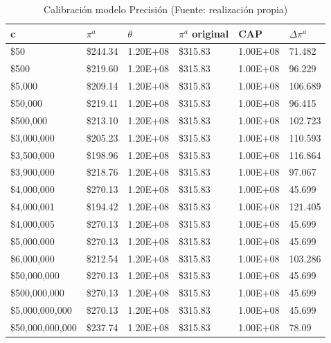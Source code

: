 \begin{table}[H]
    \centering
    \begin{tabular}{|l|l|l|l|l|l|}
    \hline
          c & $\pi^a$ & $\theta$ & $\pi^a$ original &  CAP & $\Delta \pi^a$   \\ \hline
         \$50  &  \$244.34  & 1.20E+08 &  \$315.83  & 1.00E+08 & 71.482  \\ \hline
         \$500  &  \$219.60  & 1.20E+08 &  \$315.83  & 1.00E+08 & 96.229  \\ \hline
         \$5,000  &  \$209.14  & 1.20E+08 &  \$315.83  & 1.00E+08 & 106.689  \\ \hline
         \$50,000  &  \$219.41  & 1.20E+08 &  \$315.83  & 1.00E+08 & 96.415  \\ \hline
         \$500,000  &  \$213.10  & 1.20E+08 &  \$315.83  & 1.00E+08 & 102.723  \\ \hline
         \$3,000,000  &  \$205.23  & 1.20E+08 &  \$315.83  & 1.00E+08 & 110.593  \\ \hline
         \$3,500,000  &  \$198.96  & 1.20E+08 &  \$315.83  & 1.00E+08 & 116.864  \\ \hline
         \$3,900,000  &  \$218.76  & 1.20E+08 &  \$315.83  & 1.00E+08 & 97.067  \\ \hline
         \$4,000,000  &  \$270.13  & 1.20E+08 &  \$315.83  & 1.00E+08 & 45.699  \\ \hline
         \$4,000,001  &  \$194.42  & 1.20E+08 &  \$315.83  & 1.00E+08 & 121.405  \\ \hline
         \$4,000,005  &  \$270.13  & 1.20E+08 &  \$315.83  & 1.00E+08 & 45.699  \\ \hline
         \$5,000,000  &  \$270.13  & 1.20E+08 &  \$315.83  & 1.00E+08 & 45.699  \\ \hline
         \$6,000,000  &  \$212.54  & 1.20E+08 &  \$315.83  & 1.00E+08 & 103.286  \\ \hline
         \$50,000,000  &  \$270.13  & 1.20E+08 &  \$315.83  & 1.00E+08 & 45.699  \\ \hline
         \$500,000,000  &  \$270.13  & 1.20E+08 &  \$315.83  & 1.00E+08 & 45.699  \\ \hline
         \$5,000,000,000  &  \$270.13  & 1.20E+08 &  \$315.83  & 1.00E+08 & 45.699  \\ \hline
         \$50,000,000,000  &  \$237.74  & 1.20E+08 &  \$315.83  & 1.00E+08 & 78.09  \\ \hline
    \end{tabular}
    \caption{{\footnotesize Calibración modelo Precisión (Fuente: realización propia)}}
    \label{calibracionprecision}
\end{table}

